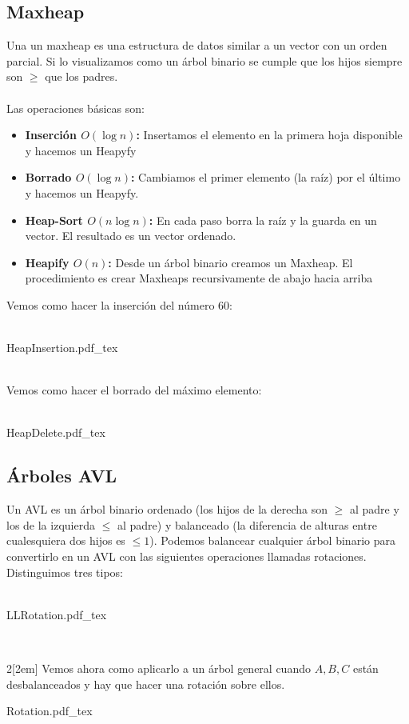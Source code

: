 \documentclass[leqno]{article}
\newcommand{\incfig}[1]{%
  \begin{center}
  \def\svgwidth{0.9\columnwidth}
  {#1.pdf_tex}
  \end{center}
}
\begin{document}
\subsection{Maxheap}
Una un maxheap es una estructura de datos similar a un vector con un orden parcial. Si lo visualizamos como un árbol binario se cumple que los hijos siempre son $\ge $ que los padres.\\
\\
Las operaciones básicas son:
\begin{itemize}
  \item \textbf{Inserción $O(\log n)$:} Insertamos el elemento en la primera hoja disponible y hacemos un Heapyfy
  \item \textbf{Borrado $O(\log n)$:} Cambiamos el primer elemento (la raíz) por el último y hacemos un Heapyfy.
  \item \textbf{Heap-Sort $O(n\log n)$:} En cada paso borra la raíz y la guarda en un vector. El resultado es un vector ordenado.
  \item \textbf{Heapify $O(n)$:} Desde un árbol binario creamos un Maxheap. El procedimiento es crear Maxheaps recursivamente de abajo hacia arriba
\end{itemize}
Vemos como hacer la inserción del número $60$:\\
\\
\incfig{HeapInsertion}
\\
Vemos como hacer el borrado del máximo elemento:\\
\\
\incfig{HeapDelete}

\subsection{Árboles AVL}
Un AVL es un árbol binario ordenado (los hijos de la derecha son $\ge $ al padre y los de la izquierda $\le $ al padre) y balanceado (la diferencia de alturas entre cualesquiera dos hijos es $\le 1$). Podemos balancear cualquier árbol binario para convertirlo en un AVL con las siguientes operaciones llamadas rotaciones. Distinguimos tres tipos: \\
\\
\incfig{LLRotation}
\\
\begin{multicols}{2}[\columnsep2em]
\noindent
Vemos ahora como aplicarlo a un árbol general cuando $A, B, C$ están desbalanceados y hay que hacer una rotación sobre ellos.
\columnbreak
\incfig{Rotation}
\end{multicols}
\end{document}
